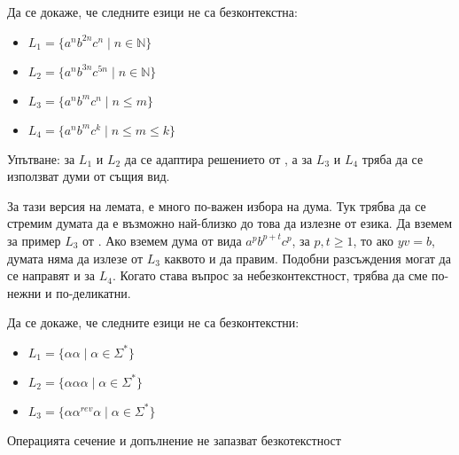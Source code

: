 \begin{problem}
Да се докаже, че следните езици не са безконтекстна:
\begin{itemize}
    \item $L_1 = \{ a^nb^{2n}c^n \mid n \in \mathbb{N} \}$
    \item $L_2 = \{ a^nb^{3n}c^{5n} \mid n \in \mathbb{N} \}$
    \item $L_3 = \{ a^nb^mc^n \mid n \leq m \}$
    \item $L_4 = \{ a^nb^mc^k \mid n \leq m \leq k \}$
\end{itemize}
Упътване: за $L_1$ и $L_2$ да се адаптира решението от , а за $L_3$ и $L_4$ тряба да се използват думи от същия вид.
\end{problem}

\begin{warning}
    За тази версия на лемата, е много по-важен избора на дума.
    Тук трябва да се стремим думата да е възможно най-близко до това да излезне от езика.
    Да вземем за пример $L_3$ от .
    Ако вземем дума от вида $a^pb^{p+t}c^p$, за $p, t \geq 1$, то ако $yv = b$, думата няма да излезе от $L_3$ каквото и да правим.
    Подобни разсъждения могат да се направят и за $L_4$.
    Когато става въпрос за небезконтекстност, трябва да сме по-нежни и по-деликатни.
\end{warning}

\begin{problem}
Да се докаже, че следните езици не са безконтекстни:
\begin{itemize}
    \item $L_1 = \{ \alpha \alpha \mid \alpha \in \Sigma^* \}$
    \item $L_2 = \{ \alpha \alpha \alpha \mid \alpha \in \Sigma^* \}$
    \item $L_3 = \{ \alpha \alpha^{rev} \alpha \mid \alpha \in \Sigma^* \}$
\end{itemize}
\end{problem}

\begin{claim}
    Операцията сечение и допълнение не запазват безкотекстност
\end{claim}

